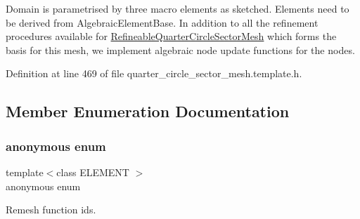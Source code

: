 Domain is parametrised by three macro elements as sketched. Elements need to be derived from Algebraic\+Element\+Base. In addition to all the refinement procedures available for \hyperlink{classoomph_1_1RefineableQuarterCircleSectorMesh}{Refineable\+Quarter\+Circle\+Sector\+Mesh} which forms the basis for this mesh, we implement algebraic node update functions for the nodes. 

Definition at line 469 of file quarter\+\_\+circle\+\_\+sector\+\_\+mesh.\+template.\+h.



\subsection{Member Enumeration Documentation}
\mbox{\label{classoomph_1_1AlgebraicRefineableQuarterCircleSectorMesh_a85eef4c11c2a88ba4bb5f99bc8406e67}} 
\subsubsection{\texorpdfstring{anonymous enum}{anonymous enum}}
{\footnotesize\ttfamily template$<$class E\+L\+E\+M\+E\+NT $>$ \\
anonymous enum\hspace{0.3cm}{\ttfamily [private]}}



Remesh function ids. 

